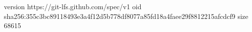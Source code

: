 version https://git-lfs.github.com/spec/v1
oid sha256:355c3bc89118493e3a4f12d5b778df8077a85fd18a4faee29f8812215afcdcf9
size 68615
